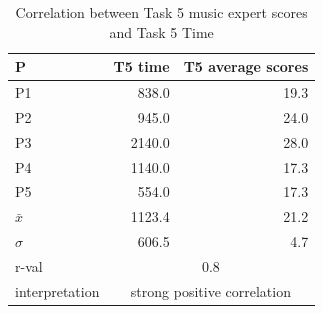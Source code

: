 \begin{table}[H]
\centering
\caption{Correlation between Task 5 music expert scores and Task 5 Time}
\begin{tabular}{lrr}
\hline \hline
  P  & T5 time & T5 average scores \\ \hline
P1             & 838.0                        & 19.3                                   \\ \hline
P2             & 945.0                        & 24.0                                   \\ \hline
P3             & 2140.0                       & 28.0                                   \\ \hline
P4             & 1140.0                       & 17.3                                   \\ \hline
P5             & 554.0                          & 17.3                            \\ \hline
$\bar{x}$             & 1123.4                       & 21.2                                   \\ \hline
$\sigma$              & 606.5                  & 4.7                            \\ \hline
r-val          & \multicolumn{2}{c}{0.8}                                              \\ \hline
interpretation & \multicolumn{2}{c}{strong positive correlation}                      \\ \hline \hline
\end{tabular}
\end{table}

